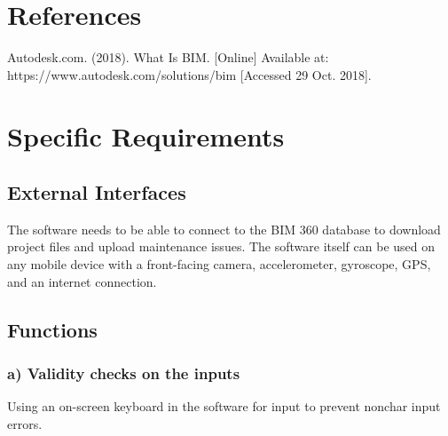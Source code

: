 \documentclass[onecolumn, draftclsnofoot,10pt, compsoc]{IEEEtran}
\begin{document}
\section{References}
    \hangindent=10mm\noindent [1] Autodesk.com. (2018). What Is BIM. [Online] Available at: https://www.autodesk.com/solutions/bim [Accessed 29 Oct. 2018]. \par

\section{Specific Requirements}
    \subsection{External Interfaces}
        \hangindent=10mm\noindent The software needs to be able to connect to the BIM 360 database to download project files and upload maintenance issues. The software itself can be used on any mobile device with a front-facing camera, accelerometer, gyroscope, GPS, and an internet connection. \par
    \subsection{Functions} %
        \subsubsection*{a) Validity checks on the inputs}
            \hangindent=10mm\noindent Using an on-screen keyboard in the software for input to prevent nonchar input errors. \par
\end{document}
